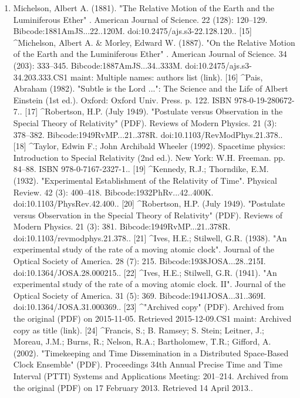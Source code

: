 \begin{enumerate}
\item Michelson, Albert A. (1881). "The Relative Motion of the Earth and the Luminiferous Ether" . American Journal of Science. 22 (128): 120–129. Bibcode:1881AmJS...22..120M. doi:10.2475/ajs.s3-22.128.120..
[15]
^Michelson, Albert A. & Morley, Edward W. (1887). "On the Relative Motion of the Earth and the Luminiferous Ether" . American Journal of Science. 34 (203): 333–345. Bibcode:1887AmJS...34..333M. doi:10.2475/ajs.s3-34.203.333.CS1 maint: Multiple names: authors list (link).
[16]
^Pais, Abraham (1982). "Subtle is the Lord ...": The Science and the Life of Albert Einstein (1st ed.). Oxford: Oxford Univ. Press. p. 122. ISBN 978-0-19-280672-7..
[17]
^Robertson, H.P. (July 1949). "Postulate versus Observation in the Special Theory of Relativity" (PDF). Reviews of Modern Physics. 21 (3): 378–382. Bibcode:1949RvMP...21..378R. doi:10.1103/RevModPhys.21.378..
[18]
^Taylor, Edwin F.; John Archibald Wheeler (1992). Spacetime physics: Introduction to Special Relativity (2nd ed.). New York: W.H. Freeman. pp. 84–88. ISBN 978-0-7167-2327-1..
[19]
^Kennedy, R.J.; Thorndike, E.M. (1932). "Experimental Establishment of the Relativity of Time". Physical Review. 42 (3): 400–418. Bibcode:1932PhRv...42..400K. doi:10.1103/PhysRev.42.400..
[20]
^Robertson, H.P. (July 1949). "Postulate versus Observation in the Special Theory of Relativity" (PDF). Reviews of Modern Physics. 21 (3): 381. Bibcode:1949RvMP...21..378R. doi:10.1103/revmodphys.21.378..
[21]
^Ives, H.E.; Stilwell, G.R. (1938). "An experimental study of the rate of a moving atomic clock". Journal of the Optical Society of America. 28 (7): 215. Bibcode:1938JOSA...28..215I. doi:10.1364/JOSA.28.000215..
[22]
^Ives, H.E.; Stilwell, G.R. (1941). "An experimental study of the rate of a moving atomic clock. II". Journal of the Optical Society of America. 31 (5): 369. Bibcode:1941JOSA...31..369I. doi:10.1364/JOSA.31.000369..
[23]
^"Archived copy" (PDF). Archived from the original (PDF) on 2015-11-05. Retrieved 2015-12-09.CS1 maint: Archived copy as title (link).
[24]
^Francis, S.; B. Ramsey; S. Stein; Leitner, J.; Moreau, J.M.; Burns, R.; Nelson, R.A.; Bartholomew, T.R.; Gifford, A. (2002). "Timekeeping and Time Dissemination in a Distributed Space-Based Clock Ensemble" (PDF). Proceedings 34th Annual Precise Time and Time Interval (PTTI) Systems and Applications Meeting: 201–214. Archived from the original (PDF) on 17 February 2013. Retrieved 14 April 2013..
\end{enumerate}
